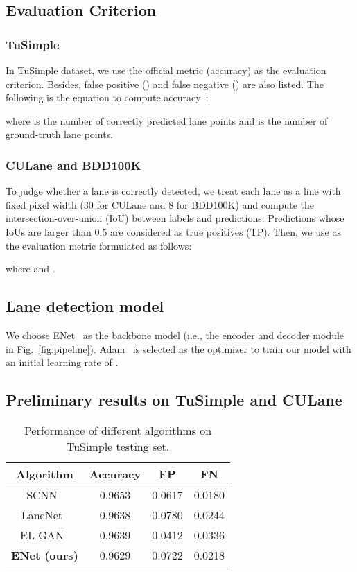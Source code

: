 \documentclass[draftcls]{IEEEtran}
\begin{document}
\subsection{Evaluation Criterion}

\subsubsection{TuSimple}

In TuSimple dataset, we use the official metric (accuracy) as the evaluation criterion. Besides, false positive () and false negative () are also listed. The following is the equation to compute accuracy~\cite{tusimple}: 



where  is the number of correctly predicted lane points and  is the number of ground-truth lane points.

\subsubsection{CULane and BDD100K}

To judge whether a lane is correctly detected, we treat each lane as a line with fixed pixel width (30 for CULane and 8 for BDD100K) and compute the intersection-over-union (IoU) between labels and predictions. Predictions whose IoUs are larger than 0.5 are considered as true positives (TP). Then, we use  as the evaluation metric formulated as follows:



where  and .



\subsection{Lane detection model}

We choose ENet~\cite{paszke2016enet} as the backbone model (i.e., the encoder and decoder module in Fig.~\ref{fig:pipeline}). Adam~\cite{kingma2014adam} is selected as the optimizer to train our model with an initial learning rate of .   

\subsection{Preliminary results on TuSimple and CULane}

\begin{table}[!t]
\caption{Performance of different algorithms on TuSimple testing set.}
\label{tusimple_table}
\centering
\begin{tabular}{c|c|c|c}
\hline
Algorithm & Accuracy & FP & FN \\
\hline \hline
SCNN~\cite{pan2017spatial} & 0.9653 & 0.0617 & 0.0180 \\
\hline
LaneNet~\cite{neven2018towards} & 0.9638 & 0.0780 & 0.0244 \\
\hline
EL-GAN~\cite{ghafoorian2018gan} & 0.9639 & 0.0412 & 0.0336 \\
\hline \hline
\textbf{ENet (ours)} & 0.9629 & 0.0722 & 0.0218 \\
\hline
\end{tabular}
\end{table}
\end{document}
